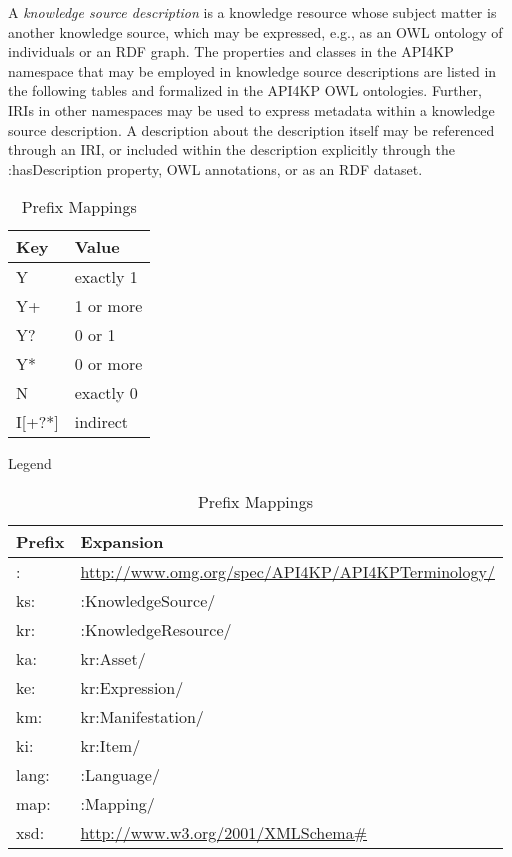 \documentclass[runningheads]{llncs}
\begin{document}
A \emph{knowledge source description} is a knowledge resource whose subject matter is another knowledge source, which may be expressed, e.g., as an OWL ontology of individuals or an RDF graph. The properties and classes in the API4KP namespace that may be employed in knowledge source descriptions are listed in the following tables and formalized in the API4KP OWL ontologies. Further, IRIs in other namespaces may be used to express metadata within a knowledge source description. A description about the description itself may be referenced through an IRI, or included within the description explicitly through the :hasDescription property,  OWL annotations, or as an RDF dataset\cite{RDF2014b}.
\begin{table}[h]
\begin{minipage}[b]{0.20\linewidth}
\centering
\begin{tabular}{|l|l|}
\hline
\textbf{Key} & \textbf{Value} \\ \hline
Y            & exactly 1      \\ \hline
Y+           & 1 or more      \\ \hline
Y?           & 0 or 1         \\ \hline
Y*           & 0 or more      \\ \hline
N            & exactly 0      \\ \hline
I[+?*]       & indirect      \\ \hline
\end{tabular}
\caption{Legend}
\label{legend}
\end{minipage}
\hspace{0.5cm}
\begin{minipage}[b]{0.70\linewidth}
\centering
\begin{tabular}{|l|l|}
\hline
\textbf{Prefix} & \textbf{Expansion} \\ \hline
:            & \url{http://www.omg.org/spec/API4KP/API4KPTerminology/}      \\ \hline
ks:            & :KnowledgeSource/      \\ \hline
kr:            & :KnowledgeResource/      \\ \hline
ka:            & kr:Asset/      \\ \hline
ke:            & kr:Expression/      \\ \hline
km:            & kr:Manifestation/      \\ \hline
ki:            & kr:Item/      \\ \hline
lang:            & :Language/      \\ \hline
map:            & :Mapping/      \\ \hline
xsd:            & \url{http://www.w3.org/2001/XMLSchema#}     \\ \hline
\end{tabular}
\caption{Prefix Mappings}
\label{abbreviations}
\end{minipage}
\end{table}
\end{document}
